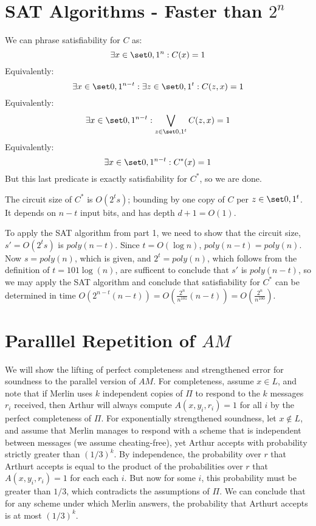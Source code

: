 \documentclass{article}
\begin{document}
\section{SAT Algorithms - Faster than $2^n$}
\begin{alphalist}
\item  We can phrase satisfiability for $C$ as: $$\exists x \in \bset^n: C(x) = 1$$ Equivalently: $$\exists x \in \bset^{n-t}: \exists z \in \bset^t : C(z, x) = 1$$ Equivalently: $$\exists x \in \bset^{n-t}: \bigvee_{z \in \bset^t} C(z, x) = 1$$ Equivalently: $$\exists x \in \bset^{n-t}: C^*(x) = 1$$ But this last predicate is exactly satisfiability for $C^*$, so we are done.
\item The circuit size of $C^*$ is $O(2^t s)$; bounding by one copy of $C$ per $z \in \bset^t$. It depends on $n-t$ input bits, and has depth $d+1 = O(1)$.
\item To apply the SAT algorithm from part 1, we need to show that the circuit size, $s' = O(2^t s)$ is $poly(n-t)$. Since $t = O(\log n)$, $poly(n-t) = poly(n)$. Now $s = poly(n)$, which is given, and $2^t = poly(n)$, which follows from the definition of $t = 101\log(n)$, are sufficent to conclude that $s'$ is $poly(n-t)$, so we may apply the SAT algorithm and conclude that satisfiability for $C^*$ can be determined in time $O(2^{n-t}(n-t)) = O(\frac{2^n}{n^{101}}(n-t)) = O(\frac{2^n}{n^{100}})$.
\end{alphalist}
\section{Paralllel Repetition of $AM$}
We will show the lifting of perfect completeness and strengthened error for soundness to the parallel version of $AM$. For completeness, assume $x \in L$, and note that if Merlin uses $k$ independent copies of $\Pi$ to respond to the $k$ messages $r_i$ received, then Arthur will always compute $A(x, y_i, r_i) = 1$ for all $i$ by the perfect completeness of $\Pi$. For exponentially strengthened soundness, let $x \not\in L$, and assume that Merlin manages to respond with a scheme that is independent between messages (we assume cheating-free), yet Arthur accepts with probability strictly greater than $(1/3)^k$. By independence, the probability over $r$ that Arthurt accepts is equal to the product of the probabilities over $r$ that $A(x, y_i, r_i) = 1$ for each each $i$. But now for some $i$, this probability must be greater than $1/3$, which contradicts the assumptions of $\Pi$. We can conclude that for any scheme under which Merlin answers, the probability that Arthurt accepts is at most $(1/3)^k$. 
\end{document}
